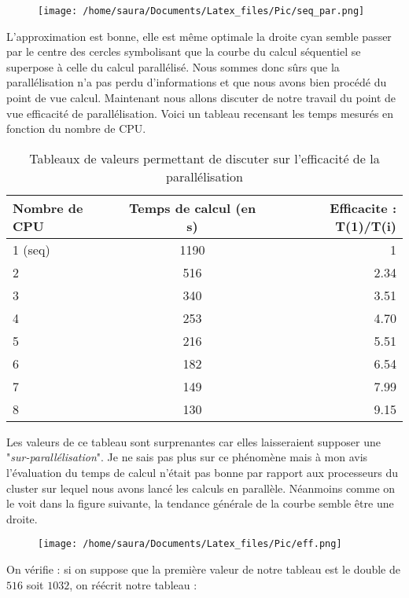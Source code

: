 \documentclass[french]{article}
\begin{document}
\begin{figure}[ht!]
\centering
\texttt{[image: /home/saura/Documents/Latex\_files/Pic/seq\_par.png]}
\end{figure}

L'approximation est bonne, elle est même optimale la droite cyan semble passer par le centre des cercles symbolisant que la courbe du calcul séquentiel se superpose à celle du calcul parallélisé. Nous sommes donc sûrs que la parallélisation n'a pas perdu d'informations et que nous avons bien procédé du point de vue calcul. Maintenant nous allons discuter de notre travail du point de vue efficacité de parallélisation. Voici un tableau recensant les temps mesurés en fonction du nombre de CPU.

 \begin{table}[ht!]  
 \centering
 \begin{tabular}{|l|c|r|}
 
  \hline
  Nombre de CPU & Temps de calcul (en s) & Efficacite : T(1)/T(i)\\
  \hline
  1 (seq) & 1190 & 1\\
  2 & 516 & 2.34\\
  3 & 340 & 3.51\\
  4 & 253 & 4.70\\
  5 & 216 & 5.51\\
  6 & 182 & 6.54\\
  7 & 149 & 7.99\\
  8 & 130 & 9.15\\
  \hline
\end{tabular}
\caption{Tableaux de valeurs permettant de discuter sur l'efficacité de la parallélisation}
\label{tabtab}
\end{table}

Les valeurs de ce tableau sont surprenantes car elles laisseraient supposer une "\textit{sur-parallélisation}". Je ne sais pas plus sur ce phénomène mais à mon avis l'évaluation du temps de calcul n'était pas bonne par rapport aux processeurs du cluster sur lequel nous avons lancé les calculs en parallèle. Néanmoins comme on le voit dans la figure suivante, la tendance générale de la courbe semble être une droite. 

\begin{figure}[ht!]
\centering
\texttt{[image: /home/saura/Documents/Latex\_files/Pic/eff.png]}
\end{figure}

\noindent On vérifie : si on suppose que la première valeur de notre tableau est le double de $516$ soit $1032$, on réécrit notre tableau : 
\end{document}
